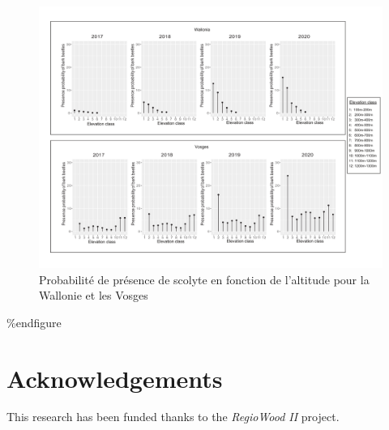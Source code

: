 \documentclass[3p,times]{elsarticle}
\begin{document}
\begin{figure} [htbp] 
		\centering
		\includegraphics[width=1\textwidth]{Wall_vs_vosges.png}
		\caption{Probabilité de présence de scolyte en fonction de l'altitude pour la Wallonie et les Vosges}
		\label{fig:sco_alti}
\end{figure}
	

\%end{figure}

\section{Acknowledgements}

This research has been funded thanks to the \textit{RegioWood II} project.



\end{document}
